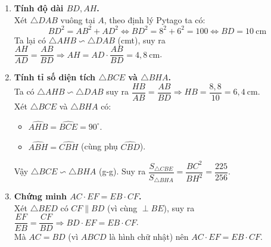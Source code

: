 \begin{ex}
{\begin{enumerate}
			\item \textbf{Tính độ dài $ BD, AH $.}\\
			Xét $ \triangle DAB $ vuông tại $ A $, theo định lý Pytago ta có:
			\[ BD^2 = AB^2  +AD^2 \Leftrightarrow BD^2 = 8^2  + 6^2 = 100 \Leftrightarrow BD = 10\mathrm{\ cm} \]
			Ta lại có $ \triangle AHB \backsim \triangle DAB  $ (cmt), suy ra $ \dfrac{AH}{AD} = \dfrac{AB}{BD} \Rightarrow AH = AD\cdot\dfrac{AB}{BD} = 4{,}8\mathrm{\ cm} $.
			\item \textbf{Tính tỉ số diện tích $ \triangle BCE $ và $ \triangle BHA $.}\\
			Ta có $ \triangle AHB \backsim \triangle DAB $ suy ra $ \dfrac{HB}{AB} = \dfrac{AB}{BD} \Rightarrow HB = \dfrac{8{,}8}{10} = 6{,}4\mathrm{\ cm} $.\\
			Xét $ \triangle BCE $ và $ \triangle BHA $ có:
			\begin{itemize}
				\item $ \widehat{AHB} = \widehat{BCE} = 90^\circ $.
				\item $ \widehat{ABH} = \widehat{CBH} $ (cùng phụ $ \widehat{CBD} $).
			\end{itemize}
			Vậy $ \triangle BCE \backsim \triangle BHA $ (g-g). Suy ra $ \dfrac{S_{\triangle CBE}}{S_{\triangle BHA}} = \dfrac{BC^2}{BH^2} = \dfrac{225}{256} $.
			\item \textbf{Chứng minh $ AC\cdot EF = EB\cdot CF $.}\\
			Xét $ \triangle BED $ có $ CF \parallel BD $ (vì cùng $ \perp BE $), suy ra $ \dfrac{EF}{EB} = \dfrac{CF}{BD} \Rightarrow BD\cdot EF = EB\cdot CF $.\\
			Mà $ AC = BD $ (vì $ ABCD $ là hình chữ nhật) nên $ AC\cdot EF = EB\cdot CF $.
		\end{enumerate}
	}
\end{ex}


